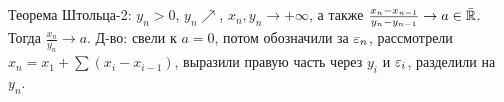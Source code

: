 \section{} %
Теорема Штольца-2: $y_n>0$, $y_n\nearrow$, $x_n, y_n \to +\infty$, а также $\frac{x_n-x_{n-1}}{y_n-y_{n-1}} \to a \in \bar{\mathbb{R}}$.
Тогда $\frac{x_n}{y_n} \to a$. Д-во: свели к $a=0$, потом обозначили за $\varepsilon_n$, рассмотрели $x_n=x_1+\sum(x_i-x_{i-1})$, выразили
правую часть через $y_i$ и $\varepsilon_i$, разделили на $y_n$.